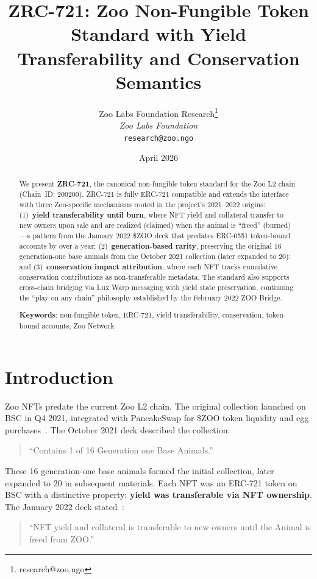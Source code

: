 \documentclass[11pt,letterpaper]{article}
\title{\textbf{ZRC-721: Zoo Non-Fungible Token Standard with Yield Transferability and Conservation Semantics}}
\author{
Zoo Labs Foundation Research\thanks{research@zoo.ngo}\\
\textit{Zoo Labs Foundation}\\
\texttt{research@zoo.ngo}
}
\date{April 2026}
\begin{document}
\zoocoverpage

\begin{abstract}
We present \textbf{ZRC-721}, the canonical non-fungible token standard for the Zoo L2 chain (Chain~ID: 200200). ZRC-721 is fully ERC-721 compatible and extends the interface with three Zoo-specific mechanisms rooted in the project's 2021--2022 origins: (1)~\textbf{yield transferability until burn}, where NFT yield and collateral transfer to new owners upon sale and are realized (claimed) when the animal is ``freed'' (burned)---a pattern from the January 2022 \$ZOO deck that predates ERC-6551 token-bound accounts by over a year; (2)~\textbf{generation-based rarity}, preserving the original 16 generation-one base animals from the October 2021 collection (later expanded to 20); and (3)~\textbf{conservation impact attribution}, where each NFT tracks cumulative conservation contributions as non-transferable metadata. The standard also supports cross-chain bridging via Lux Warp messaging with yield state preservation, continuing the ``play on any chain'' philosophy established by the February 2022 ZOO Bridge.

\textbf{Keywords}: non-fungible token, ERC-721, yield transferability, conservation, token-bound accounts, Zoo Network
\end{abstract}

\section{Introduction}

Zoo NFTs predate the current Zoo L2 chain. The original collection launched on BSC in Q4 2021, integrated with PancakeSwap for \$ZOO token liquidity and egg purchases~\cite{zoo-oct-2021-deck}. The October 2021 deck described the collection:

\begin{quote}
``Contains 1 of 16 Generation one Base Animals.''
\end{quote}

These 16 generation-one base animals formed the initial collection, later expanded to 20 in subsequent materials. Each NFT was an ERC-721 token on BSC with a distinctive property: \textbf{yield was transferable via NFT ownership}. The January 2022 deck stated~\cite{zoo-jan-2022-deck}:

\begin{quote}
``NFT yield and collateral is transferable to new owners until the Animal is freed from ZOO.''
\end{quote}
\end{document}
